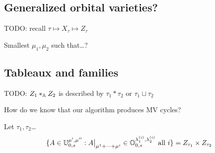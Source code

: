 \documentclass[draft]{article}
\begin{document}

\subsection{Generalized orbital varieties?}
TODO: recall $\tau\mapsto X_\tau \mapsto Z_\tau$

\begin{question}
    Smallest $\mu_1, \mu_2$ such that\dots?
\end{question}

\subsection{Tableaux and families}

TODO: $Z_1\ast_\AA Z_2$ is described by $\tau_1\ast\tau_2$ or $\tau_1\sqcup\tau_2$

\begin{question}
    How do we know that our algorithm produces MV cycles? 
\end{question}

\begin{proposition}
    Let $\tau_1,\tau_2$\dots 
    \[
    \{A\in\UU_{0,s}^{\mu',\mu''} : A \big|_{\mu^1 + \cdots + \mu^i} \in \OO_{0,s}^{\lambda_{1}^{(i)},\lambda_2^{(i)}} \text{ all } i\} = Z_{\tau_1}\times Z_{\tau_2}
    \]
\end{proposition}
\end{document}
